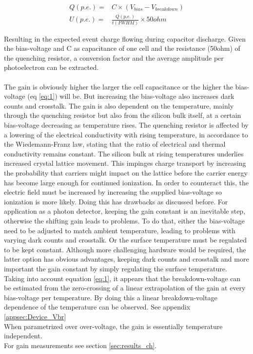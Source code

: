 \documentclass[12pt,article,type=msc,colorback,accentcolor=tud9c]{tudthesis}
\begin{document}
\begin{equation}\label{eq:2}
\begin{split}
Q(p.e.) = & C \times (V_{bias}-V_{breakdown})\\
U(p.e.) = & \frac{Q(p.e.)}{t(FWHM)} \times 50ohm
\end{split}
\end{equation}


Resulting in the expected event charge flowing during capacitor discharge. Given the bias-voltage and C as capacitance of one cell and the resistance (50ohm) of the quenching resistor, a conversion factor and the average amplitude per photoelectron can be extracted.\\\\
The gain is obviously higher the larger the cell capacitance or the higher the bias-voltage (eq \ref{eq:1}) will be. But increasing the bias-voltage also increases dark counts and crosstalk. 
The gain is also dependent on the temperature, mainly through the quenching resistor but also from the silicon bulk itself, at a certain bias-voltage decreasing as temperature rises. The quenching resistor is affected by a lowering of the electrical conductivity with rising temperature, in accordance to the Wiedemann-Franz law, stating that the ratio of electrical and thermal conductivity remains constant. The silicon bulk at rising temperatures underlies increased crystal lattice movement. This impinges charge transport by increasing the probability that carriers might impact on the lattice before the carrier energy has become large enough for continued ionization. In order to counteract this, the electric field must be increased by increasing the supplied bias-voltage so ionization is more likely. Doing this has drawbacks as discussed before. For application as a photon detector, keeping the gain constant is an inevitable step, otherwise the shifting gain leads to problems. To do that, either the bias-voltage need to be adjusted to match ambient temperature, leading to problems with varying dark counts and crosstalk. Or the surface temperature must be regulated to be kept constant. Although more challenging hardware would be required, the latter option has obvious advantages, keeping dark counts and crosstalk and more important the gain constant by simply regulating the surface temperature.\\
Taking into account equation \ref{eq:1}, it appears that the breakdown-voltage can be estimated from the zero-crossing of a linear extrapolation of the gain at every bias-voltage per temperature. By doing this a linear breakdown-voltage dependence of the temperature can be observed. See appendix {\ref{appsec:Device_Vbr}}\\
When parametrized over over-voltage, the gain is essentially temperature independent.\\
For gain measurements see section {\ref{sec:results_ch}}.
\end{document}

